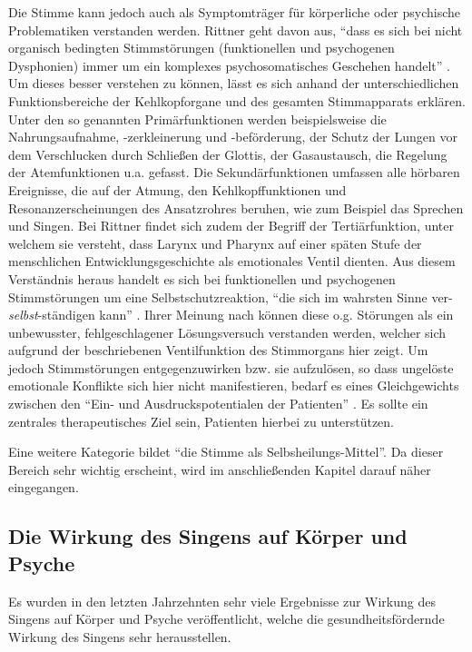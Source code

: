 Die Stimme kann jedoch auch als Symptomträger für körperliche oder psychische Problematiken verstanden werden. Rittner geht davon aus, "`dass es sich bei nicht organisch bedingten Stimmstörungen (funktionellen und psychogenen Dysphonien) immer um ein komplexes psychosomatisches Geschehen handelt"' \autocite[212f.]{rittner2008}. Um dieses besser verstehen zu können, lässt es sich anhand der unterschiedlichen Funktionsbereiche der Kehlkopforgane und des gesamten Stimmapparats erklären. Unter den so genannten Primärfunktionen werden beispielsweise die Nahrungsaufnahme, -zerkleinerung und -beförderung, der Schutz der Lungen vor dem Verschlucken durch Schließen der Glottis, der Gasaustausch, die Regelung der Atemfunktionen u.a. gefasst. Die Sekundärfunktionen umfassen alle hörbaren Ereignisse, die auf der Atmung, den Kehlkopffunktionen und Resonanzerscheinungen des Ansatzrohres beruhen, wie zum Beispiel das Sprechen und Singen. Bei Rittner findet sich zudem der Begriff der Tertiärfunktion, unter welchem sie versteht, dass Larynx und Pharynx auf einer späten Stufe der menschlichen Entwicklungsgeschichte als emotionales Ventil dienten. Aus diesem Verständnis heraus handelt es sich bei funktionellen und psychogenen Stimmstörungen um eine Selbstschutzreaktion, "`die sich im wahrsten Sinne ver-\emph{selbst}-ständigen kann"' \autocite[213]{rittner2008}. Ihrer Meinung nach können diese o.g. Störungen als ein unbewusster, fehlgeschlagener Lösungsversuch verstanden werden, welcher sich aufgrund der beschriebenen Ventilfunktion des Stimmorgans hier zeigt. Um jedoch Stimmstörungen entgegenzuwirken bzw. sie aufzulösen, so dass ungelöste emotionale Konflikte sich hier nicht manifestieren, bedarf es eines Gleichgewichts zwischen den "`Ein- und Ausdruckspotentialen der Patienten"' \autocite[64]{rittner2012}. Es sollte ein zentrales therapeutisches Ziel sein, Patienten hierbei zu unterstützen. 

Eine weitere Kategorie bildet "`die Stimme als Selbsheilungs-Mittel"'. Da dieser Bereich sehr wichtig erscheint, wird im anschließenden Kapitel darauf näher eingegangen.

\subsection{Die Wirkung des Singens auf Körper und Psyche} 
Es wurden in den letzten Jahrzehnten sehr viele Ergebnisse zur Wirkung des Singens auf Körper und Psyche veröffentlicht, welche die gesundheitsfördernde Wirkung des Singens sehr herausstellen.

